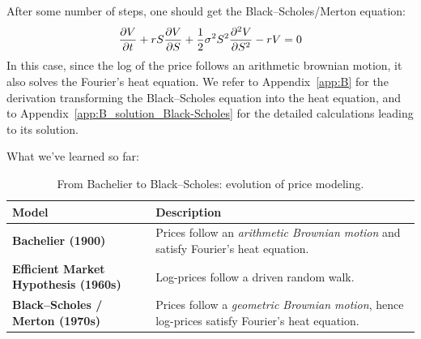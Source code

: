 After some number of steps, one should get the Black--Scholes/Merton equation:
\begin{equation} \label{eq:Black–Scholes}
    \pdv{V}{t} + rS \pdv{V}{S} + \frac{1}{2} \sigma^2 S^2 \pdv[2]{V}{S} - rV = 0
\end{equation}
In this case, since the log of the price follows an arithmetic brownian motion, it also solves the Fourier's heat equation.
We refer to Appendix~\ref{app:B} for the derivation transforming the Black--Scholes equation into the heat equation, and to Appendix~\ref{app:B_solution_Black-Scholes} for the detailed calculations leading to its solution.

What we've learned so far:

\begin{table}[H]
\centering
{}
\begin{tabular}{@{}p{3.8cm}p{8.2cm}@{}}
\toprule
\rowcolor{gray!15}
\textbf{Model} & \textbf{Description} \\ \midrule
\textbf{Bachelier (1900)} &
Prices follow an \emph{arithmetic Brownian motion} and satisfy Fourier's heat equation. \\[2pt]
\textbf{Efficient Market Hypothesis (1960s)} &
Log-prices follow a driven random walk. \\[2pt]
\textbf{Black–Scholes / Merton (1970s)} &
Prices follow a \emph{geometric Brownian motion}, hence log-prices satisfy Fourier's heat equation. \\ 
\bottomrule
\end{tabular}
\caption{From Bachelier to Black–Scholes: evolution of price modeling.}
\end{table}


